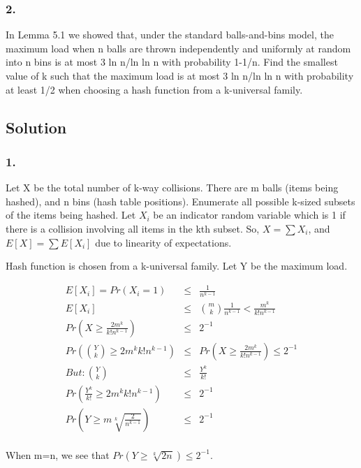 \documentclass[10pt]{amsart}
\theoremstyle{remark}
\begin{document}
\subsubsection{2.} In Lemma 5.1 we showed that, under the standard balls-and-bins model, the maximum load when n balls are thrown independently and uniformly at random into n bins is at most 3 ln n/ln ln n with probability 1-1/n. Find the smallest value of k such that the maximum load is at most 3 ln n/ln ln n with probability at least 1/2 when choosing a hash function from a k-universal family.

\subsection{Solution}
\subsubsection{1.} 
Let X be the total number of k-way collisions. There are m balls (items being hashed), and n bins (hash table positions). Enumerate all possible k-sized subsets of the items being hashed. Let $X_{i}$ be an indicator random variable which is 1 if there is a collision involving all items in the kth subset. So, $X = \sum X_{i}$, and $E[X] = \sum E[X_{i}]$ due to linearity of expectations.

Hash function is chosen from a k-universal family. Let Y be the maximum load.

\begin{eqnarray}
E[X_{i}] = Pr(X_{i}=1) &\leq& \frac{1}{n^{k-1}} \\
E[X_{i}] &\leq& \binom{m}{k} \frac{1}{n^{k-1}} < \frac{m^{k}}{k!n^{k-1}}\\
Pr(X \geq \frac{2m^{k}}{k!n^{k-1}}) &\leq& 2^{-1}\\
Pr(\binom{Y}{k} \geq {2m^{k}}{k!n^{k-1}}) &\leq& Pr(X \geq \frac{2m^{k}}{k!n^{k-1}}) \leq 2^{-1}\\
But: \binom{Y}{k} &\leq& \frac{Y^{k}}{k!}\\
Pr(\frac{Y^{k}}{k!} \geq {2m^{k}}{k!n^{k-1}}) &\leq& 2^{-1}\\
Pr(Y \geq m\sqrt[k]{\frac{2}{n^{k-1}}}) &\leq& 2^{-1}\\
\end{eqnarray} 

When m=n, we see that $Pr(Y \geq \sqrt[k]{2n}) \leq 2^{-1}$.
\end{document}
